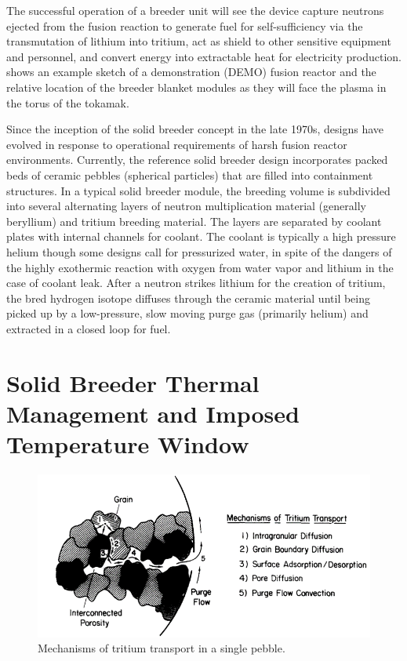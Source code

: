 The successful operation of a breeder unit will see the device capture neutrons ejected from the fusion reaction to generate fuel for self-sufficiency via the transmutation of lithium into tritium, act as shield to other sensitive equipment and personnel, and convert energy into extractable heat for electricity production.  shows an example sketch of a demonstration (DEMO) fusion reactor and the relative location of the breeder blanket modules as they will face the plasma in the torus of the tokamak. %

Since the inception of the solid breeder concept in the late 1970s, designs have evolved in response to operational requirements of harsh fusion reactor environments. Currently, the reference solid breeder design incorporates packed beds of ceramic pebbles (spherical particles) that are filled into containment structures. In a typical solid breeder module, the breeding volume is subdivided into several alternating layers of neutron multiplication material (generally beryllium) and tritium breeding material. The layers are separated by coolant plates with internal channels for coolant. The coolant is typically a high pressure helium though some designs call for pressurized water, in spite of the dangers of the highly exothermic reaction with oxygen from water vapor and lithium in the case of coolant leak. After a neutron strikes lithium for the creation of tritium, the bred hydrogen isotope diffuses through the ceramic material until being picked up by a low-pressure, slow moving purge gas (primarily helium) and extracted in a closed loop for fuel.


\section{Solid Breeder Thermal Management and Imposed Temperature Window}

\begin{figure}[ht]
    \centering
    \includegraphics[width=\singleimagewidth]{figures/mechanisms_tritium_transport} 
    \caption{Mechanisms of tritium transport in a single pebble\cite{Federici1990}.}
    \label{fig:mechanisms_tritium_transport}
\end{figure}

